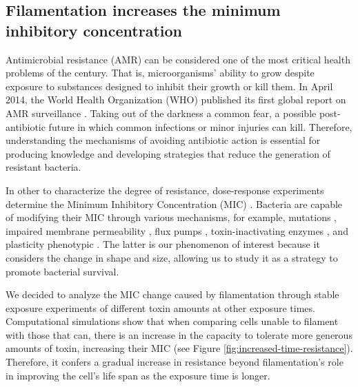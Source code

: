 \documentclass[a4paper, nobind]{templates/ociamthesis}
\begin{document}
\hypertarget{filamentation-increases-the-minimum-inhibitory-concentration}{%
\subsection{Filamentation increases the minimum inhibitory concentration}\label{filamentation-increases-the-minimum-inhibitory-concentration}}

Antimicrobial resistance (AMR) can be considered one of the most critical health problems of the century.
That is, microorganisms' ability to grow despite exposure to substances designed to inhibit their growth or kill them.
In April 2014, the World Health Organization (WHO) published its first global report on AMR surveillance \autocite{EditorialBoard2014}.
Taking out of the darkness a common fear, a possible post-antibiotic future in which common infections or minor injuries can kill.
Therefore, understanding the mechanisms of avoiding antibiotic action is essential for producing knowledge and developing strategies that reduce the generation of resistant bacteria.

In other to characterize the degree of resistance, dose-response experiments determine the Minimum Inhibitory Concentration (MIC) \autocite{andrewsDeterminationMinimumInhibitory2002}. Bacteria are capable of modifying their MIC through various mechanisms, for example, mutations \autocite{lambertBacterialResistanceAntibiotics2005}, impaired membrane permeability \autocite{satoOuterMembranePermeability1991}, flux pumps \autocite{webberImportanceEffluxPumps2003}, toxin-inactivating enzymes \autocite{wrightBacterialResistanceAntibiotics2005}, and plasticity phenotypic \autocite{justiceMorphologicalPlasticityBacterial2008}.
The latter is our phenomenon of interest because it considers the change in shape and size, allowing us to study it as a strategy to promote bacterial survival.

We decided to analyze the MIC change caused by filamentation through stable exposure experiments of different toxin amounts at other exposure times.
Computational simulations show that when comparing cells unable to filament with those that can, there is an increase in the capacity to tolerate more generous amounts of toxin, increasing their MIC (see Figure \ref{fig:increased-time-resistance}).
Therefore, it confers a gradual increase in resistance beyond filamentation's role in improving the cell's life span as the exposure time is longer.
\end{document}
